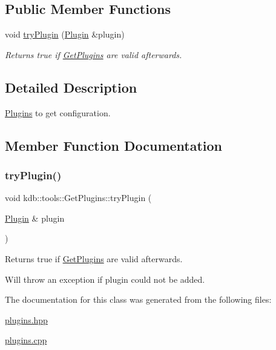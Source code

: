 \subsection*{Public Member Functions}
\begin{DoxyCompactItemize}
\item 
void \hyperlink{classkdb_1_1tools_1_1GetPlugins_a175a3f9bb0054ff13537760fcb0fb861}{try\+Plugin} (\hyperlink{classkdb_1_1tools_1_1Plugin}{Plugin} \&plugin)
\begin{DoxyCompactList}\small\item\em Returns true if \hyperlink{classkdb_1_1tools_1_1GetPlugins}{Get\+Plugins} are valid afterwards. \end{DoxyCompactList}\end{DoxyCompactItemize}


\subsection{Detailed Description}
\hyperlink{classkdb_1_1tools_1_1Plugins}{Plugins} to get configuration. 

\subsection{Member Function Documentation}
\mbox{\label{classkdb_1_1tools_1_1GetPlugins_a175a3f9bb0054ff13537760fcb0fb861}} 
\subsubsection{\texorpdfstring{try\+Plugin()}{tryPlugin()}}
{\footnotesize\ttfamily void kdb\+::tools\+::\+Get\+Plugins\+::try\+Plugin (\begin{DoxyParamCaption}\item[{\hyperlink{classkdb_1_1tools_1_1Plugin}{Plugin} \&}]{plugin }\end{DoxyParamCaption})}



Returns true if \hyperlink{classkdb_1_1tools_1_1GetPlugins}{Get\+Plugins} are valid afterwards. 

Will throw an exception if plugin could not be added. 

The documentation for this class was generated from the following files\+:\begin{DoxyCompactItemize}
\item 
\hyperlink{plugins_8hpp}{plugins.\+hpp}\item 
\hyperlink{plugins_8cpp}{plugins.\+cpp}\end{DoxyCompactItemize}
